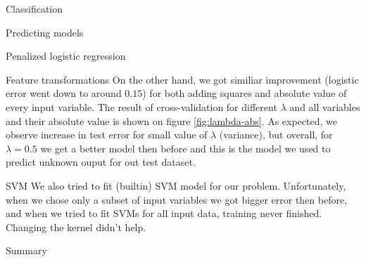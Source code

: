 \documentclass{article}
\begin{document}
\begin{section}{Classification}
\begin{subsection}{Predicting models}
\begin{subsubsection}{Penalized logistic regression}
\begin{subsubsection}{Feature transformations}
On the other hand, we got similiar improvement (logistic error went down to around $0.15$) for both adding squares and absolute value of every input variable. The result of cross-validation for different $\lambda$ and all variables and their absolute value is shown on figure \ref{fig:lambda-abs}. As expected, we observe increase in test error for small value of $\lambda$ (variance), but overall, for $\lambda = 0.5$ we get a better model then before and this is the model we used to predict unknown ouput for out test dataset.
\end{subsubsection}
\end{subsubsection}
\begin{subsubsection}{SVM}
We also tried to fit (builtin) SVM model for our problem. Unfortunately, when we chose only a subset of input variables we got bigger error then before, and when we tried to fit SVMs for all input data, training never finished. Changing the kernel didn't help.
\end{subsubsection}
\end{subsection}
\begin{subsection}{Summary}
\end{subsection}
\end{section}
\end{document}
